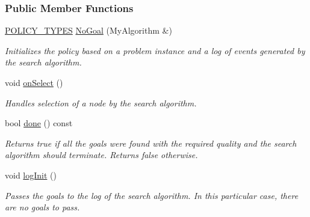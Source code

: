 \subsubsection*{Public Member Functions}
\begin{DoxyCompactItemize}
\item 
\hyperlink{extensions_2shared__policies_2headers_8h_ae70a06fa4631780beea14971eb36a562}{P\+O\+L\+I\+C\+Y\+\_\+\+T\+Y\+P\+ES} \hyperlink{structslb_1_1ext_1_1policy_1_1goalHandler_1_1NoGoal_af3ec578f42a0433dddff506cf89d9bf9}{No\+Goal} (My\+Algorithm \&)\hypertarget{structslb_1_1ext_1_1policy_1_1goalHandler_1_1NoGoal_af3ec578f42a0433dddff506cf89d9bf9}{}\label{structslb_1_1ext_1_1policy_1_1goalHandler_1_1NoGoal_af3ec578f42a0433dddff506cf89d9bf9}

\begin{DoxyCompactList}\small\item\em Initializes the policy based on a problem instance and a log of events generated by the search algorithm. \end{DoxyCompactList}\item 
void \hyperlink{structslb_1_1ext_1_1policy_1_1goalHandler_1_1NoGoal_a1ec14fa0e2a866bc50e05701e82f42e3}{on\+Select} ()\hypertarget{structslb_1_1ext_1_1policy_1_1goalHandler_1_1NoGoal_a1ec14fa0e2a866bc50e05701e82f42e3}{}\label{structslb_1_1ext_1_1policy_1_1goalHandler_1_1NoGoal_a1ec14fa0e2a866bc50e05701e82f42e3}

\begin{DoxyCompactList}\small\item\em Handles selection of a node by the search algorithm. \end{DoxyCompactList}\item 
bool \hyperlink{structslb_1_1ext_1_1policy_1_1goalHandler_1_1NoGoal_a5321efd1812497a4519af8ac304487de}{done} () const 
\begin{DoxyCompactList}\small\item\em Returns {\ttfamily true} if all the goals were found with the required quality and the search algorithm should terminate. Returns {\ttfamily false} otherwise. \end{DoxyCompactList}\item 
void \hyperlink{structslb_1_1ext_1_1policy_1_1goalHandler_1_1NoGoal_a361912e2dbf8ea3c9214568b98b7335d}{log\+Init} ()
\begin{DoxyCompactList}\small\item\em Passes the goals to the log of the search algorithm. In this particular case, there are no goals to pass. \end{DoxyCompactList}\end{DoxyCompactItemize}


